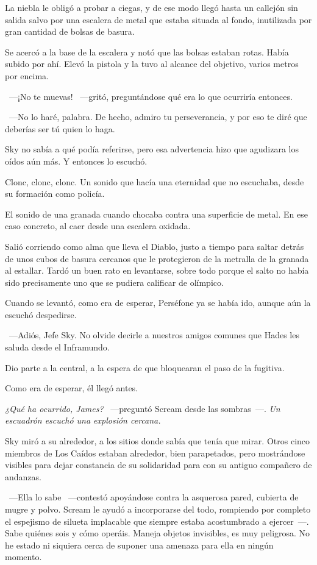 La niebla le obligó a probar a ciegas, y de ese modo llegó hasta un callejón sin salida salvo por una escalera de metal que estaba situada al fondo, inutilizada por gran cantidad de bolsas de basura.

Se acercó a la base de la escalera y notó que las bolsas estaban rotas. Había subido por ahí. Elevó la pistola y la tuvo al alcance del objetivo, varios metros por encima.

~---¡No te muevas! ~---gritó, preguntándose qué era lo que ocurriría entonces.

~---No lo haré, palabra. De hecho, admiro tu perseverancia, y por eso te diré que deberías ser tú quien lo haga.

Sky no sabía a qué podía referirse, pero esa advertencia hizo que agudizara los oídos aún más. Y entonces lo escuchó.

Clonc, clonc, clonc. Un sonido que hacía una eternidad que no escuchaba, desde su formación como policía.

El sonido de una granada cuando chocaba contra una superficie de metal. En ese caso concreto, al caer desde una escalera oxidada.

Salió corriendo como alma que lleva el Diablo, justo a tiempo para saltar detrás de unos cubos de basura cercanos que le protegieron de la metralla de la granada al estallar. Tardó un buen rato en levantarse, sobre todo porque el salto no había sido precisamente uno que se pudiera calificar de olímpico.

Cuando se levantó, como era de esperar, Perséfone ya se había ido, aunque aún la escuchó despedirse.

~---Adiós, Jefe Sky. No olvide decirle a nuestros amigos comunes que Hades les saluda desde el Inframundo.

Dio parte a la central, a la espera de que bloquearan el paso de la fugitiva.

Como era de esperar, él llegó antes.

\emph{¿Qué ha ocurrido, James?} ~---preguntó Scream desde las sombras~---. \emph{Un escuadrón escuchó una explosión cercana.}

Sky miró a su alrededor, a los sitios donde sabía que tenía que mirar. Otros cinco miembros de Los Caídos estaban alrededor, bien parapetados, pero mostrándose visibles para dejar constancia de su solidaridad para con su antiguo compañero de andanzas.

~---Ella lo sabe ~---contestó apoyándose contra la asquerosa pared, cubierta de mugre y polvo. Scream le ayudó a incorporarse del todo, rompiendo por completo el espejismo de silueta implacable que siempre estaba acostumbrado a ejercer~---. Sabe quiénes sois y cómo operáis. Maneja objetos invisibles, es muy peligrosa. No he estado ni siquiera cerca de suponer una amenaza para ella en ningún momento.

